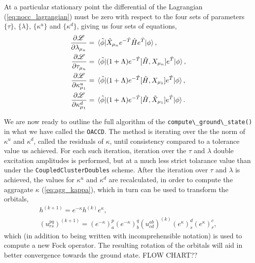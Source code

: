     At a particular stationary point the differential of the Lagrangian
    (\autoref{eq:nocc_lagrangian}) must be zero with respect to the four sets of 
    parameters $\{\tau\}$, $\{\lambda\}$, $\{\kappa^u\}$ and $\{\kappa^d\}$, giving
    us four sets of equations,
    \begin{align}
        \frac{\partial \mathscr{L}}{\partial \lambda_{\mu_n}}
            &= \mel*{\tilde{\phi}}
            {\tilde{X}_{\mu_n} e^{-\hat{T}}\hat{H}e^{\hat{T}}}
            {\phi}, \\
        \frac{\partial \mathscr{L}}{\partial \tau_{\mu_n}}
            &= \mel*{\tilde{\phi}}
            {(1 + \Lambda)e^{-\hat{T}}[\hat{H}, X_{\mu_n}]e^{\hat{T}}}
            {\phi}, \\
        \frac{\partial \mathscr{L}}{\partial \kappa^u_{\mu_1}}
            &= \mel*{\tilde{\phi}}
            {(1 + \Lambda)e^{-\hat{T}}[\hat{H}, X_{\mu_1}]e^{\hat{T}}}
            {\phi}, \\
        \frac{\partial \mathscr{L}}{\partial \kappa^d_{\mu_1}}
            &= \mel*{\tilde{\phi}}
            {(1 + \Lambda)e^{-\hat{T}}[\hat{H}, \tilde{X}_{\mu_1}]e^{\hat{T}}}
            {\phi}.
    \end{align}

    We are now ready to outline the full algorithm of the 
    \lstinline{compute\_ground\_state()} in what we have called the \lstinline{OACCD}.
    The method is iterating over the the norm of $\kappa^u$ and $\kappa^d$, called the 
    residuals of $\kappa$, until consistency compared to a tolerance value us achieved. 
    For each such iteration, iteration over the $\tau$ and $\lambda$ double excitation
    amplitudes is performed, but at a much less strict tolarance value than under the 
    \lstinline{CoupledClusterDoubles} scheme. After the iteration over $\tau$ and $\lambda$ 
    is achieved, the values for $\kappa^u$ and $\kappa^d$ are recalculated, in order to 
    compute the aggragate $\kappa$ (\autoref{eq:agg_kappa}), 
    which in turn can be used to transform the orbitals,
    \begin{equation*}
        \begin{gathered}
            h^{(k + 1)} = e^{-\kappa} h^{(k)} e^{\kappa}, \\
            (u^{pq}_{rs})^{(k + 1)}
            = (e^{-\kappa})^p_a (e^{-\kappa})^q_b 
                (u^{ab}_{cd})^{(k)}
            (e^{\kappa})^d_s (e^{\kappa})^c_r,
        \end{gathered}
    \end{equation*}
    which (in addition to being written with incomprehensible notation) is used to compute 
    a new Fock operator. The resulting rotation of the orbitals will aid in better 
    convergence towards the ground state. FLOW CHART??
    
